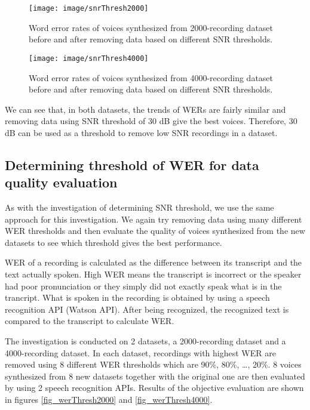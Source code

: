 \documentclass[12pt]{article}
\begin{document}
\begin{figure}[t]
\begin{center}
\texttt{[image: image/snrThresh2000]}
\end{center}
\vspace{-0.3cm}
\caption[SNR thresholds 2000.]{Word error rates of voices synthesized from 2000-recording dataset before and after removing data based on different SNR thresholds.}
\label{fig_snrThresh2000}
\end{figure}

\begin{figure}[t]
\begin{center}
\texttt{[image: image/snrThresh4000]}
\end{center}
\vspace{-0.3cm}
\caption[SNR thresholds 4000.]{Word error rates of voices synthesized from 4000-recording dataset before and after removing data based on different SNR thresholds.}
\label{fig_snrThresh4000}
\end{figure}

We can see that, in both datasets, the trends of WERs are fairly similar and removing data using SNR threshold of 30 dB give the best voices. Therefore, 30 dB can be used as a threshold to remove low SNR recordings in a dataset.

\subsection{Determining threshold of WER for data quality evaluation}
As with the investigation of determining SNR threshold, we use the same approach for this investigation. We again try removing data using many different WER thresholds and then evaluate the quality of voices synthesized from the new datasets to see which threshold gives the best performance.

WER of a recording is calculated as the difference between its transcript and the text actually spoken. High WER means the transcript is incorrect or the speaker had poor pronunciation or they simply did not exactly speak what is in the trancript. What is spoken in the recording is obtained by using a speech recognition API (Watson API). After being recognized, the recognized text is compared to the transcript to calculate WER.

The investigation is conducted on 2 datasets, a 2000-recording dataset and a 4000-recording dataset. In each dataset, recordings with highest WER are removed using 8 different WER thresholds which are 90\%, 80\%, …, 20\%. 8 voices synthesized from 8 new datasets together with the original one are then evaluated by using 2 speech recognition APIs. Results of the objective evaluation are shown in figures \ref{fig_werThresh2000} and \ref{fig_werThresh4000}.
\end{document}
